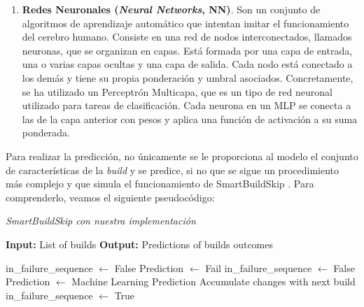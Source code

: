 \begin{enumerate}
    \item \textbf{Redes Neuronales (\textit{Neural Networks}, NN)}. Son un conjunto de algoritmos
    de aprendizaje automático que intentan imitar el funcionamiento del cerebro humano. Consiste en
    una red de nodos interconectados, llamados neuronas, que se organizan en capas. Está formada
    por una capa de entrada, una o varias capas ocultas y una capa de salida. Cada nodo está
    conectado a los demás y tiene su propia ponderación y umbral asociados. Concretamente, se ha
    utilizado un Perceptrón Multicapa, que es un tipo de red neuronal utilizado para tareas de
    clasificación. Cada neurona en un MLP se conecta a las de la capa anterior con pesos
    y aplica una función de activación a su suma ponderada.
\end{enumerate}

Para realizar la predicción, no únicamente se le proporciona al modelo el conjunto de
características de la \textit{build} y se predice, si no que se sigue un procedimiento más
complejo y que simula el funcionamiento de SmartBuildSkip \cite{2}. Para comprenderlo, veamos
el siguiente pseudocódigo:

\begin{algorithm}[H]
    \caption{\textit{SmartBuildSkip con nuestra implementación}}
    \begin{algorithmic}[1]
    \State \textbf{Input:} List of builds
    \State \textbf{Output:} Predictions of builds outcomes
    
    \State in\_failure\_sequence $\gets$ False 
            \State Prediction $\gets$ Fail  
                           
                \State in\_failure\_sequence $\gets$ False 
            \EndIf
            \Else
            \State Prediction $\gets$ Machine Learning Prediction 
                \State Accumulate changes with next build       
            \Else
                                                
                    \State in\_failure\_sequence $\gets$ True   
                \EndIf
            \EndIf
        \EndIf
    \EndFor
    \end{algorithmic}
\end{algorithm}

